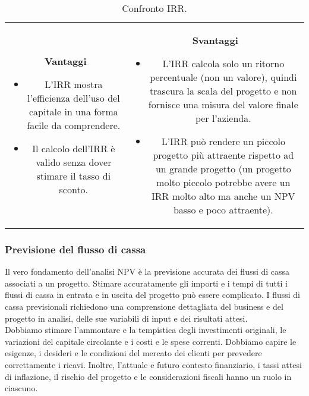 \documentclass[a4paper,portrait,12pt]{article}
\theoremstyle{definition}
\begin{document}
\begin{table}[h]
\begin{tabular}{cc}
\begin{minipage}[t]{.5\linewidth}
\textbf{Vantaggi}
\begin{itemize}
\item L'IRR mostra l'efficienza dell'uso del capitale in una forma facile da comprendere.
\item Il calcolo dell'IRR è valido senza dover stimare il tasso di sconto.
\end{itemize}
\end{minipage}
&
\begin{minipage}[t]{.5\linewidth}
\textbf{Svantaggi}
\begin{itemize}
\item L'IRR calcola solo un ritorno percentuale (non un valore), quindi trascura la scala del progetto e non fornisce una misura del valore finale per l'azienda.
\item L'IRR può rendere un piccolo progetto più attraente rispetto ad un grande progetto (un progetto molto piccolo potrebbe avere un IRR molto alto ma anche un NPV basso e poco attraente).
\end{itemize}
\end{minipage}
\end{tabular}
\caption{Confronto IRR.}
\end{table}

\subsubsection{Previsione del flusso di cassa}

Il vero fondamento dell'analisi NPV è la previsione accurata dei flussi di cassa associati a un progetto.
Stimare accuratamente gli importi e i tempi di tutti i flussi di cassa in entrata e in uscita del progetto può essere complicato.
I flussi di cassa previsionali richiedono una comprensione dettagliata del business e del progetto in analisi, delle sue variabili di input e dei risultati attesi.\\

Dobbiamo stimare l'ammontare e la tempistica degli investimenti originali, le variazioni del capitale circolante e i costi e le spese correnti.
Dobbiamo capire le esigenze, i desideri e le condizioni del mercato dei clienti per prevedere correttamente i ricavi.
Inoltre, l'attuale e futuro contesto finanziario, i tassi attesi di inflazione, il rischio del progetto e le considerazioni fiscali hanno un ruolo in ciascuno.\\
\end{document}
